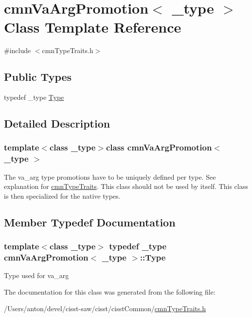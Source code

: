 \hypertarget{classcmn_va_arg_promotion}{}\section{cmn\+Va\+Arg\+Promotion$<$ \+\_\+type $>$ Class Template Reference}
\label{classcmn_va_arg_promotion}


{\ttfamily \#include $<$cmn\+Type\+Traits.\+h$>$}

\subsection*{Public Types}
\begin{DoxyCompactItemize}
\item 
typedef \+\_\+type \hyperlink{classcmn_va_arg_promotion_aeb4fd516094432431f659afa58113a8c}{Type}
\end{DoxyCompactItemize}


\subsection{Detailed Description}
\subsubsection*{template$<$class \+\_\+type$>$class cmn\+Va\+Arg\+Promotion$<$ \+\_\+type $>$}

The va\+\_\+arg type promotions have to be uniquely defined per type. See explanation for \hyperlink{classcmn_type_traits}{cmn\+Type\+Traits}. This class should not be used by itself. This class is then specialized for the native types. 

\subsection{Member Typedef Documentation}
\hypertarget{classcmn_va_arg_promotion_aeb4fd516094432431f659afa58113a8c}{}
\subsubsection[{Type}]{\setlength{\rightskip}{0pt plus 5cm}template$<$class \+\_\+type$>$ typedef \+\_\+type {\bf cmn\+Va\+Arg\+Promotion}$<$ \+\_\+type $>$\+::{\bf Type}}\label{classcmn_va_arg_promotion_aeb4fd516094432431f659afa58113a8c}
Type used for va\+\_\+arg 

The documentation for this class was generated from the following file\+:\begin{DoxyCompactItemize}
\item 
/\+Users/anton/devel/cisst-\/saw/cisst/cisst\+Common/\hyperlink{cmn_type_traits_8h}{cmn\+Type\+Traits.\+h}\end{DoxyCompactItemize}

